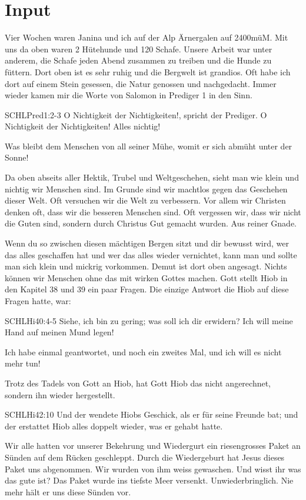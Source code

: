 \documentclass{../../inc/mybib}
\begin{document}
\section{ Input }
\begin{spacing}{1.5}
Vier Wochen waren Janina und ich auf der Alp Ärnergalen auf 2400müM. Mit uns da oben waren 2 Hütehunde und 120 Schafe. Unsere Arbeit war unter anderem, die Schafe jeden Abend zusammen zu treiben und die Hunde zu füttern. Dort oben ist es sehr ruhig und die Bergwelt ist grandios. Oft habe ich dort auf einem Stein gesessen, die Natur genossen und nachgedacht. Immer wieder kamen mir die Worte von Salomon in Prediger 1 in den Sinn.
\begin{bibelbox}{SCHL}{Pred}{1:2-3}
   O Nichtigkeit der Nichtigkeiten!, spricht der Prediger. O Nichtigkeit der Nichtigkeiten! Alles nichtig!

   Was bleibt dem Menschen von all seiner Mühe, womit er sich abmüht unter der Sonne!
\end{bibelbox}
Da oben abseits aller Hektik, Trubel und Weltgeschehen, sieht man wie klein und nichtig wir Menschen sind. Im Grunde sind wir machtlos gegen das Geschehen dieser Welt. Oft versuchen wir die Welt zu verbessern. Vor allem wir Christen denken oft, dass wir die besseren Menschen sind. Oft vergessen wir, dass wir nicht die Guten sind, sondern durch Christus Gut gemacht wurden. Aus reiner Gnade. 

Wenn du so zwischen diesen mächtigen Bergen sitzt und dir bewusst wird, wer das alles geschaffen hat und wer das alles wieder vernichtet, kann man und sollte man sich klein und mickrig vorkommen. Demut ist dort oben angesagt. Nichts können wir Menschen ohne das mit wirken Gottes machen. Gott stellt Hiob in den Kapitel 38 und 39 ein paar Fragen. Die einzige Antwort die Hiob auf diese Fragen hatte, war:
\begin{bibelbox}{SCHL}{Hi}{40:4-5}
    Siehe, ich bin zu gering; was soll ich dir erwidern? Ich will meine Hand auf meinen Mund legen!

    Ich habe einmal geantwortet, und noch ein zweites Mal, und ich will es nicht mehr tun!
\end{bibelbox}
    Trotz des Tadels von Gott an Hiob, hat Gott Hiob das nicht angerechnet, sondern ihn wieder hergestellt.
\begin{bibelbox}{SCHL}{Hi}{42:10}
    Und der \herr wendete Hiobs Geschick, als er für seine Freunde bat; und der \herr erstattet Hiob alles doppelt wieder, was er gehabt hatte.
\end{bibelbox}
Wir alle hatten vor unserer Bekehrung und Wiedergurt ein riesengrosses Paket an Sünden auf dem Rücken geschleppt. Durch die Wiedergeburt hat Jesus dieses Paket uns abgenommen. Wir wurden von ihm weiss gewaschen. Und wisst ihr was das gute ist? Das Paket wurde ins tiefste Meer versenkt. Unwiederbringlich. Nie mehr hält er uns diese Sünden vor.


\end{spacing}
\end{document}
